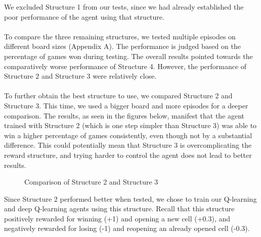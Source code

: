 We excluded Structure 1 from our tests, since we had already established the poor performance of the agent using that structure. 
\\\\
To compare the three remaining structures, we tested multiple episodes on different board sizes (Appendix A). The performance is judged based on the percentage of games won during testing. The overall results pointed towards the comparatively worse performance of Structure 4. However, the performance of Structure 2 and Structure 3 were relatively close.
\\\\
To further obtain the best structure to use, we compared Structure 2 and Structure 3. This time, we used a bigger board and more episodes for a deeper comparison. The results, as seen in the figures below, manifest that the agent trained with Structure 2 (which is one step simpler than Structure 3) was able to win a higher percentage of games consistently, even though not by a substantial difference. This could potentially mean that Structure 3 is overcomplicating the reward structure, and trying harder to control the agent does not lead to better results.

\begin{figure}[H]
\centering
{}
\caption{Comparison of Structure 2 and Structure 3}
\end{figure}

Since Structure 2 performed better when tested, we chose to train our Q-learning and deep Q-learning agents using this structure. Recall that this structure positively rewarded for winning (+1) and opening a new cell (+0.3), and negatively rewarded for losing (-1) and reopening an already opened cell (-0.3).
